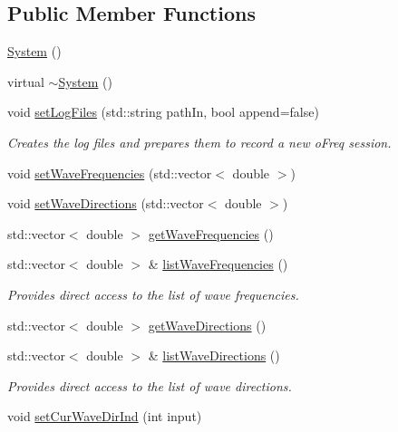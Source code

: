 \subsection*{Public Member Functions}
\begin{DoxyCompactItemize}
\item 
\hyperlink{classosea_1_1ofreq_1_1_system_ae317936c9bcf1374d61745572e0f2f8a}{System} ()
\item 
virtual \hyperlink{classosea_1_1ofreq_1_1_system_a3be70bb338e3f062f821173fd15680d0}{$\sim$\-System} ()
\item 
void \hyperlink{classosea_1_1ofreq_1_1_system_abc29578672ec470d6c2e916164e129f4}{set\-Log\-Files} (std\-::string path\-In, bool append=false)
\begin{DoxyCompactList}\small\item\em Creates the log files and prepares them to record a new o\-Freq session. \end{DoxyCompactList}\item 
void \hyperlink{classosea_1_1ofreq_1_1_system_ac044fdc41aa436151bea0c81c8f70bc1}{set\-Wave\-Frequencies} (std\-::vector$<$ double $>$)
\item 
void \hyperlink{classosea_1_1ofreq_1_1_system_a246decc05b383e47fba6d42318cf64ef}{set\-Wave\-Directions} (std\-::vector$<$ double $>$)
\item 
std\-::vector$<$ double $>$ \hyperlink{classosea_1_1ofreq_1_1_system_a18b18022b6468a41dfdbfc49c881b933}{get\-Wave\-Frequencies} ()
\item 
std\-::vector$<$ double $>$ \& \hyperlink{classosea_1_1ofreq_1_1_system_a02a78c7751da784608be2dc2afbb4022}{list\-Wave\-Frequencies} ()
\begin{DoxyCompactList}\small\item\em Provides direct access to the list of wave frequencies. \end{DoxyCompactList}\item 
std\-::vector$<$ double $>$ \hyperlink{classosea_1_1ofreq_1_1_system_a8e1d633a4b604223236e4cc4de35bd70}{get\-Wave\-Directions} ()
\item 
std\-::vector$<$ double $>$ \& \hyperlink{classosea_1_1ofreq_1_1_system_a18cbe26b239cf4ee83210ac6679f773f}{list\-Wave\-Directions} ()
\begin{DoxyCompactList}\small\item\em Provides direct access to the list of wave directions. \end{DoxyCompactList}\item 
void \hyperlink{classosea_1_1ofreq_1_1_system_a1bdee1bedde63db2d813fda1036f8299}{set\-Cur\-Wave\-Dir\-Ind} (int input)

\end{DoxyCompactItemize}

